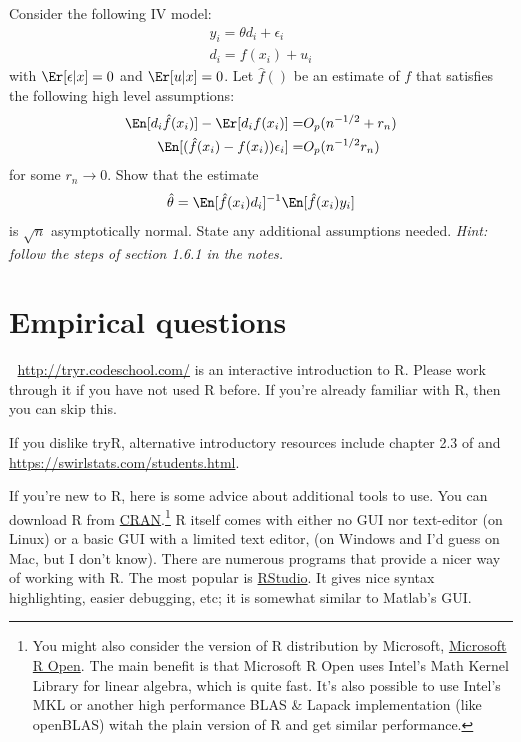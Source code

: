 \begin{problem}
  Consider the following IV model:
  \begin{align*}
    y_i = \theta d_i + \epsilon_i \\
    d_i = f(x_i) + u_i
  \end{align*}
  with $\Er[\epsilon|x] = 0$ and $\Er[u|x] = 0$. Let $\hat{f}()$ be an
  estimate of $f$ that satisfies the following high level assumptions:
  \begin{align}
    \En[d_i \hat{f}(x_i)] - \Er[d_i f(x_i)] = & O_p(n^{-1/2} +
                                                      r_n) \label{r1} \\
    \En[(\hat{f}(x_i) - f(x_i)) \epsilon_i] = & O_p(n^{-1/2} r_n) \label{r2}
  \end{align}
  for some $r_n \to 0$. Show that the estimate
  \begin{align*}
    \hat{\theta} = \En[\hat{f}(x_i) d_i]^{-1} \En[\hat{f}(x_i) y_i ]
  \end{align*}
  is $\sqrt{n}$ asymptotically normal. State any additional
  assumptions needed. {\slshape{Hint: follow the steps of section
      1.6.1 in the notes}.}
\end{problem}

\section{Empirical questions}

\begin{problem} $\;$
  \url{http://tryr.codeschool.com/} is an interactive introduction to
  R. Please work through it if you have not used R before. If you're
  already familiar with R, then you can skip this.

  If you dislike tryR, alternative introductory resources include
  chapter 2.3 of \cite{james2013} and \href{Swirl}
  {https://swirlstats.com/students.html}.   
\end{problem}

If you're new to R, here is some advice about additional tools to
use. You can download R from
\href{https://cran.r-project.org/}{CRAN}.\footnote{You might also consider the
version of R distribution by Microsoft,
\href{https://mran.microsoft.com/rro}{Microsoft R Open}. The main
benefit is that Microsoft R Open uses Intel's Math Kernel Library for
linear algebra, which is quite fast. It's also possible to use Intel's
MKL or another high performance BLAS \& Lapack implementation (like
openBLAS) witah the plain version of R and get similar
performance.}
R itself comes with either no GUI nor text-editor (on Linux) or a
basic GUI with a limited text editor, (on Windows and I'd guess on
Mac, but I don't know). There are numerous programs that provide a
nicer way of working with R. The most popular is
\href{https://www.rstudio.com/} {RStudio}. It gives nice syntax
highlighting, easier debugging, etc; it is somewhat similar to
Matlab's GUI.  

